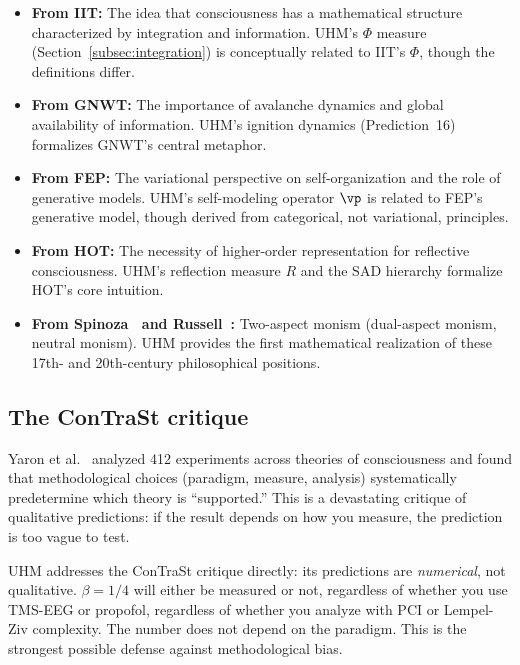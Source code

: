 \begin{itemize}[leftmargin=2em]
  \item \textbf{From IIT:} The idea that consciousness has a mathematical structure
        characterized by integration and information. UHM's $\Phi$ measure
        (Section~\ref{subsec:integration}) is conceptually related to IIT's $\Phi$, though
        the definitions differ.
  \item \textbf{From GNWT:} The importance of avalanche dynamics and global availability
        of information. UHM's ignition dynamics (Prediction~16) formalizes GNWT's central
        metaphor.
  \item \textbf{From FEP:} The variational perspective on self-organization and the
        role of generative models. UHM's self-modeling operator $\vp$ is related to FEP's
        generative model, though derived from categorical, not variational, principles.
  \item \textbf{From HOT:} The necessity of higher-order representation for reflective
        consciousness. UHM's reflection measure $R$ and the SAD hierarchy formalize HOT's
        core intuition.
  \item \textbf{From Spinoza~\cite{spinoza1677} and Russell~\cite{russell1927}:}
        Two-aspect monism (dual-aspect monism, neutral monism). UHM provides the first
        mathematical realization of these 17th- and 20th-century philosophical positions.
\end{itemize}

\subsection{The ConTraSt critique}

Yaron et al.~\cite{yaron2022} analyzed 412 experiments across theories of consciousness
and found that methodological choices (paradigm, measure, analysis) systematically
predetermine which theory is ``supported.'' This is a devastating critique of qualitative
predictions: if the result depends on how you measure, the prediction is too vague to test.

UHM addresses the ConTraSt critique directly: its predictions are \emph{numerical}, not
qualitative. $\beta = 1/4$ will either be measured or not, regardless of whether you use
TMS-EEG or propofol, regardless of whether you analyze with PCI or Lempel-Ziv complexity.
The number does not depend on the paradigm. This is the strongest possible defense against
methodological bias.

